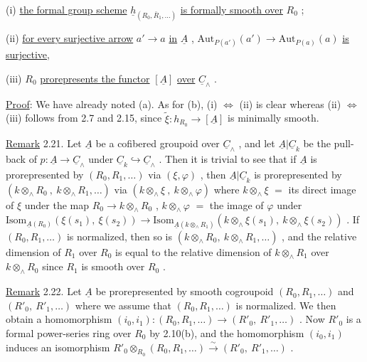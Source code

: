(i)   \underline{the formal group scheme}  $\underline{h}_{(R_0,\bar{R}_1,\dots)}$  \underline{is formally smooth over}  $R_0$  ;

(ii)  \underline{for every surjective arrow}  $a' \to a$  \underline{in}  $\underline{A}$  ,
$\mathrm{Aut}_{P(a')}(a') \longrightarrow \mathrm{Aut}_{P(a)}(a)$  \underline{is surjective},

(iii)  $R_0$  \underline{prorepresents the functor}  $[\underline{A}]$  \underline{over}  $\underline{C}_\wedge$  .



\underline{Proof}:  We have already noted (a). As for (b),  (i) $\Leftrightarrow$ (ii)  is clear whereas (ii) $\Leftrightarrow$ (iii)  follows from 2.7 and 2.15, since  $\tilde{\xi} : h_{R_0} \longrightarrow [\underline{A}]$  is minimally smooth.

\underline{Remark} 2.21.  Let  $\underline{A}$  be a cofibered groupoid over  $\underline{C}_\wedge$  , and let  $\underline{A}|\underline{C}_k$  be the pull-back of  $p : \underline{A} \longrightarrow \underline{C}_\wedge$  under  $\underline{C}_k \hookrightarrow \underline{C}_\wedge$ . Then it is trivial to see that if  $\underline{A}$  is prorepresented by  $(R_0,R_1,\dots)$  via  $(\xi,\varphi)$  , then  $\underline{A}|\underline{C}_k$  is prorepresented by  $(k \otimes_\wedge R_0\ ,\ k \otimes_\wedge R_1,\dots)$  via  $(k \otimes_\wedge \xi\ ,\ k \otimes_\wedge \varphi)$  where  $k \otimes_\wedge \xi$ $=$ its direct image of  $\xi$  under the map  $R_0 \longrightarrow k \otimes_\wedge R_0$ ,  $k \otimes_\wedge \varphi$ $=$ the image of  $\varphi$  under  $\mathrm{Isom}_{\underline{A}(R_0)}(\xi(s_1),\ \xi(s_2)) \longrightarrow \mathrm{Isom}_{\underline{A}(k \otimes_\wedge R_1)}(k \otimes_\wedge \xi(s_1),\ k \otimes_\wedge \xi(s_2))$ . If  $(R_0,R_1,\dots)$  is normalized, then so is  $(k \otimes_\wedge R_0,\ k \otimes_\wedge R_1,\dots)$  , and the relative dimension of  $R_1$  over  $R_0$  is equal to the relative dimension of  $k \otimes_\wedge R_1$  over  $k \otimes_\wedge R_0$  since  $R_1$  is smooth over  $R_0$  .

\underline{Remark} 2.22.  Let  $\underline{A}$  be prorepresented by smooth cogroupoid  $(R_0,R_1,\dots)$  and  $(R'_0,\ R'_1,\dots)$  where we assume that  $(R_0,R_1,\dots)$  is normalized. We then obtain a homomorphism  $(i_0,i_1) : (R_0,R_1,\dots) \longrightarrow (R'_0,\ R'_1,\dots)$  . Now  $R'_0$  is a formal power-series ring over  $R_0$  by 2.10(b), and the homomorphism  $(i_0,i_1)$  induces an isomorphism  $R'_0 \otimes_{R_0} (R_0,R_1,\dots) \overset{\sim}{\longrightarrow} (R'_0,\ R'_1,\dots)$  .


